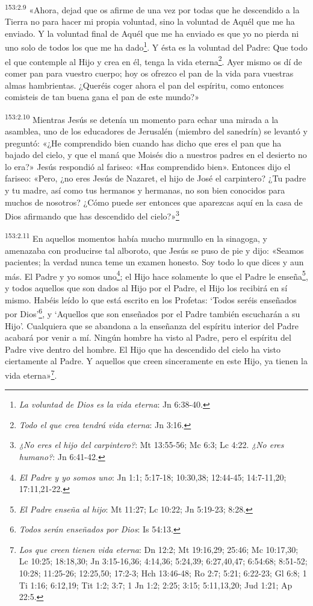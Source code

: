 \par
\textsuperscript{153:2.9} «Ahora, dejad que os afirme de una vez por todas que he descendido a la Tierra no para hacer mi propia voluntad, sino la voluntad de Aquél que me ha enviado. Y la voluntad final de Aquél que me ha enviado es que yo no pierda ni uno solo de todos los que me ha dado\footnote{\textit{La voluntad de Dios es la vida eterna}: Jn 6:38-40.}. Y ésta es la voluntad del Padre: Que todo el que contemple al Hijo y crea en él, tenga la vida eterna\footnote{\textit{Todo el que crea tendrá vida eterna}: Jn 3:16.}. Ayer mismo os dí de comer pan para vuestro cuerpo; hoy os ofrezco el pan de la vida para vuestras almas hambrientas. ¿Queréis coger ahora el pan del espíritu, como entonces comisteis de tan buena gana el pan de este mundo?»

\par
\textsuperscript{153:2.10} Mientras Jesús se detenía un momento para echar una mirada a la asamblea, uno de los educadores de Jerusalén (miembro del sanedrín) se levantó y preguntó: «¿He comprendido bien cuando has dicho que eres el pan que ha bajado del cielo, y que el maná que Moisés dio a nuestros padres en el desierto no lo era?» Jesús respondió al fariseo: «Has comprendido bien». Entonces dijo el fariseo: «Pero, ¿no eres Jesús de Nazaret, el hijo de José el carpintero? ¿Tu padre y tu madre, así como tus hermanos y hermanas, no son bien conocidos para muchos de nosotros? ¿Cómo puede ser entonces que aparezcas aquí en la casa de Dios afirmando que has descendido del cielo?»\footnote{\textit{¿No eres el hijo del carpintero?}: Mt 13:55-56; Mc 6:3; Lc 4:22. \textit{¿No eres humano?}: Jn 6:41-42.}

\par
\textsuperscript{153:2.11} En aquellos momentos había mucho murmullo en la sinagoga, y amenazaba con producirse tal alboroto, que Jesús se puso de pie y dijo: «Seamos pacientes; la verdad nunca teme un examen honesto. Soy todo lo que dices y aun más. El Padre y yo somos uno\footnote{\textit{El Padre y yo somos uno}: Jn 1:1; 5:17-18; 10:30,38; 12:44-45; 14:7-11,20; 17:11,21-22.}; el Hijo hace solamente lo que el Padre le enseña\footnote{\textit{El Padre enseña al hijo}: Mt 11:27; Lc 10:22; Jn 5:19-23; 8:28.}, y todos aquellos que son dados al Hijo por el Padre, el Hijo los recibirá en sí mismo. Habéis leído lo que está escrito en los Profetas: `Todos seréis enseñados por Dios'\footnote{\textit{Todos serán enseñados por Dios}: Is 54:13.}, y `Aquellos que son enseñados por el Padre también escucharán a su Hijo'. Cualquiera que se abandona a la enseñanza del espíritu interior del Padre acabará por venir a mí. Ningún hombre ha visto al Padre, pero el espíritu del Padre vive dentro del hombre. El Hijo que ha descendido del cielo ha visto ciertamente al Padre. Y aquellos que creen sinceramente en este Hijo, ya tienen la vida eterna»\footnote{\textit{Los que creen tienen vida eterna}: Dn 12:2; Mt 19:16,29; 25:46; Mc 10:17,30; Lc 10:25; 18:18,30; Jn 3:15-16,36; 4:14,36; 5:24,39; 6:27,40,47; 6:54:68; 8:51-52; 10:28; 11:25-26; 12:25,50; 17:2-3; Hch 13:46-48; Ro 2:7; 5:21; 6:22-23; Gl 6:8; 1 Ti 1:16; 6:12,19; Tit 1:2; 3:7; 1 Jn 1:2; 2:25; 3:15; 5:11,13,20; Jud 1:21; Ap 22:5.}.

